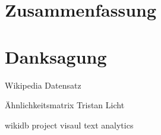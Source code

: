\chapter{Zusammenfassung}
\label{chap:Zusammenfassung}


\cleardoublepage
\clearpage



\newpage
\let\cleardoublepage\clearpage
\chapter*{Danksagung}

Wikipedia Datensatz

Ähnlichkeitsmatrix Tristan Licht

wikidb project visaul text analytics









%

{\footnotesize

}



\newpage
% 

%




